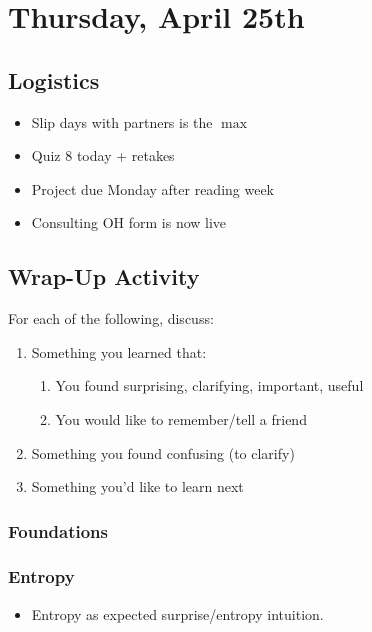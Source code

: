 \section{Thursday, April 25th}
\subsection{Logistics}
\begin{itemize}
    \item Slip days with partners is the $\max$
    \item Quiz 8 today + retakes
    \item Project due Monday after reading week
    \item Consulting OH form is now live
\end{itemize}

\subsection{Wrap-Up Activity}
For each of the following, discuss:
\begin{enumerate}
    \item Something you learned that:
    \begin{enumerate}
        \item You found surprising, clarifying, important, useful
        \item You would like to remember/tell a friend
    \end{enumerate}
    \item Something you found confusing (to clarify)
    \item Something you'd like to learn next
\end{enumerate}

\subsubsection{Foundations}
\subsubsection{Entropy}
\begin{itemize}
    \item Entropy as expected surprise/entropy intuition.
\end{itemize}


